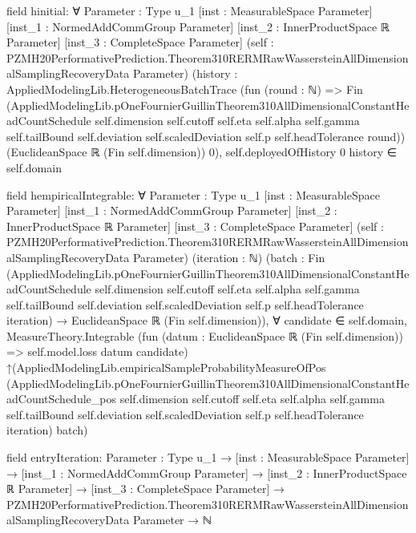 \documentclass[10pt]{article}
\begin{document}
\begin{ReviewVerbatim}
field hinitial:
∀ {Parameter : Type u_1} [inst : MeasurableSpace Parameter] [inst_1 : NormedAddCommGroup Parameter]
  [inst_2 : InnerProductSpace ℝ Parameter] [inst_3 : CompleteSpace Parameter]
  (self : PZMH20PerformativePrediction.Theorem310RERMRawWassersteinAllDimensionalSamplingRecoveryData Parameter)
  (history :
    AppliedModelingLib.HeterogeneousBatchTrace
      (fun (round : ℕ) =>
        Fin
          (AppliedModelingLib.pOneFournierGuillinTheorem310AllDimensionalConstantHeadCountSchedule self.dimension
            self.cutoff self.eta self.alpha self.gamma self.tailBound self.deviation self.scaledDeviation self.p
            self.headTolerance round))
      (EuclideanSpace ℝ (Fin self.dimension)) 0),
  self.deployedOfHistory 0 history ∈ self.domain

field hempiricalIntegrable:
∀ {Parameter : Type u_1} [inst : MeasurableSpace Parameter] [inst_1 : NormedAddCommGroup Parameter]
  [inst_2 : InnerProductSpace ℝ Parameter] [inst_3 : CompleteSpace Parameter]
  (self : PZMH20PerformativePrediction.Theorem310RERMRawWassersteinAllDimensionalSamplingRecoveryData Parameter)
  (iteration : ℕ)
  (batch :
    Fin
        (AppliedModelingLib.pOneFournierGuillinTheorem310AllDimensionalConstantHeadCountSchedule self.dimension
          self.cutoff self.eta self.alpha self.gamma self.tailBound self.deviation self.scaledDeviation self.p
          self.headTolerance iteration) →
      EuclideanSpace ℝ (Fin self.dimension)),
  ∀ candidate ∈ self.domain,
    MeasureTheory.Integrable (fun (datum : EuclideanSpace ℝ (Fin self.dimension)) => self.model.loss datum candidate)
      ↑(AppliedModelingLib.empiricalSampleProbabilityMeasureOfPos
          (AppliedModelingLib.pOneFournierGuillinTheorem310AllDimensionalConstantHeadCountSchedule_pos self.dimension
            self.cutoff self.eta self.alpha self.gamma self.tailBound self.deviation self.scaledDeviation self.p
            self.headTolerance iteration)
          batch)

field entryIteration:
{Parameter : Type u_1} →
  [inst : MeasurableSpace Parameter] →
    [inst_1 : NormedAddCommGroup Parameter] →
      [inst_2 : InnerProductSpace ℝ Parameter] →
        [inst_3 : CompleteSpace Parameter] →
          PZMH20PerformativePrediction.Theorem310RERMRawWassersteinAllDimensionalSamplingRecoveryData Parameter → ℕ


\end{ReviewVerbatim}
\end{document}
